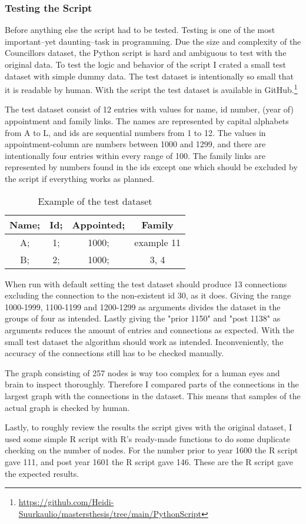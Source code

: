 \subsubsection{Testing the Script}
Before anything else the script had to be tested. Testing is one of the most important–yet daunting–task in programming. Due the size and complexity of the Councillors dataset, the Python script is hard and ambiguous to test with the original data. To test the logic and behavior of the script I crated a small test dataset with simple dummy data. The test dataset is intentionally so small that it is readable by human. With the script the test dataset is available in GitHub.\footnote{\url{https://github.com/Heidi-Suurkaulio/mastersthesis/tree/main/PythonScript}} 

The test dataset consist of 12 entries with values for name, id number, (year of) appointment and family links. The names are represented by capital alphabets from A to L, and ids are sequential numbers from 1 to 12. The values in appointment-column are numbers between 1000 and 1299, and there are intentionally four entries within every range of 100. The family links are represented by numbers found in the ids except one which should be excluded by the script if everything works as planned. 

\begin{table}
	\caption{Example of the test dataset}
	\centering
	\begin{tabular}{cccc}	
		\hline
		Name; &Id; &Appointed; &Family\\
		\hline
		A; &1; &1000; &example 11\\
		\hline
		B; &2; &1000; &3, 4\\
		\hline
	\end{tabular}
\end{table}

When run with default setting the test dataset should produce 13 connections excluding the connection to the non-existent id 30, as it does. Giving the range 1000-1999, 1100-1199 and 1200-1299 as arguments divides the dataset in the groups of four as intended. Lastly giving the "prior 1150" and "post 1138" as arguments reduces the amount of entries and connections as expected. With the small test dataset the algorithm should work as intended. Inconveniently, the accuracy of the connections still has to be checked manually. 

The graph consisting of 257 nodes is way too complex for a human eyes and brain to inspect thoroughly. Therefore I compared parts of the connections in the largest graph with the connections in the dataset. This means that samples of the actual graph is checked by human. 

Lastly, to roughly review the results the script gives with the original dataset, I used some simple R script with R's ready-made functions to do some duplicate checking on the number of nodes. For the number prior to year 1600 the R script gave 111, and post year 1601 the R script gave 146. These are the R script gave the expected results.